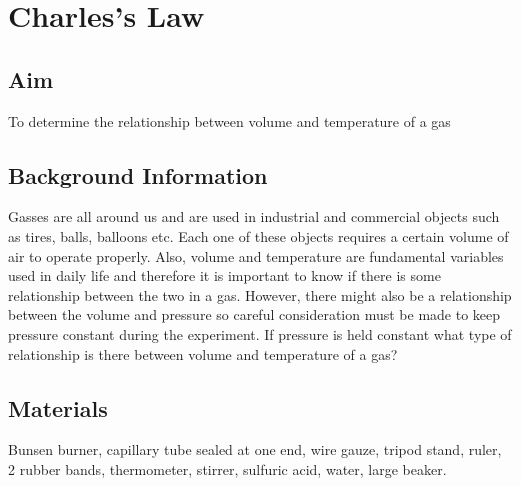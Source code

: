 \chapter{Charles's Law}

\section{Aim}
To determine the relationship between volume and temperature of a gas

\section{Background Information}
Gasses are all around us and are used in industrial and commercial objects such as tires, balls, balloons etc. Each one of these objects requires a certain volume of air to operate properly. Also, volume and temperature are fundamental variables used in daily life and therefore it is important to know if there is some relationship between the two in a gas. However, there might also be a relationship between the volume and pressure so careful consideration must be made to keep pressure constant during the experiment. If pressure is held constant what type of relationship is there between volume and temperature of a gas?

\section{Materials}
Bunsen burner, capillary tube sealed at one end, wire gauze, tripod stand, ruler, 2 rubber bands, thermometer, stirrer, sulfuric acid, water, large beaker. 

